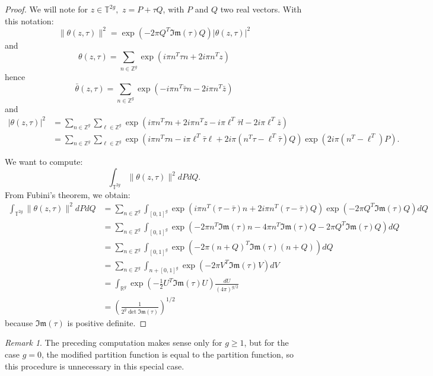 \documentclass{article}
\theoremstyle{definition}
\theoremstyle{remark}
\newtheorem{Remark}[theorem]{Remark}
\begin{document}
\begin{proof}We will note for $z \in \mathbb{T}^{2g}, $ $z=P+\tau Q$, with $P$ and $Q$ two real vectors. With this notation: $$\|\theta(z,\tau)\|^{2}=\exp\left(-2\pi Q^{T}\mathfrak{Im}(\tau) Q \right)|\theta(z,\tau)|^{2}$$
and $$\theta(z,\tau)=\sum_{n \in \mathbb{Z}^{g}}\exp\left(i\pi n^{T}\tau n+2i\pi n^{T}z \right)$$
hence $$\bar{\theta}(z,\tau)=\sum_{n \in \mathbb{Z}^{g}}\exp\left(-i\pi n^{T}\bar{\tau} n-2i\pi n^{T}\bar{z} \right)$$
and \begin{align*}|\theta(z,\tau)|^{2}&=\sum_{n\in \mathbb{Z}^{g}}\sum_{\ell\in \mathbb{Z}^{g}}\exp\left(i\pi n^{T}\tau n+2i\pi n^{T}z -i\pi \ell^{T}\bar{\tau} l-2i\pi \ell^{T}\bar{z}\right)\\&=\sum_{n\in \mathbb{Z}^{g}}\sum_{\ell\in \mathbb{Z}^{g}}\exp\left(i\pi n^{T}\tau n -i\pi \ell^{T}\bar{\tau} \ell+2i\pi (n^{T}\tau - \ell^{T}\bar{\tau})Q\right)\exp\left(2i\pi (n^{T}-\ell^{T})P \right).\end{align*}

We want to compute: $$\int_{\mathbb{T}^{2g}}\|\theta(z,\tau)\|^{2}dP dQ. $$ From Fubini's theorem, we obtain: 
\begin{align*}
\int_{\mathbb{T}^{2g}}\|\theta(z,\tau)\|^{2}dP dQ&=\sum_{n\in \mathbb{Z}^{g}}\int_{[0,1]^{g}}\exp\left(i\pi n^{T}(\tau-\bar{\tau}) n +2i\pi n^{T}(\tau - \bar{\tau})Q\right)\exp\left(-2\pi Q^{T}\mathfrak{Im}(\tau) Q \right)dQ \\&=\sum_{n\in \mathbb{Z}^{g}}\int_{[0,1]^{g}}\exp \left(-2\pi n^{T}\mathfrak{Im}(\tau)n-4\pi n^{T}\mathfrak{Im}(\tau)Q-2\pi Q^{T}\mathfrak{Im}(\tau)Q \right)dQ \\&=\sum_{n\in \mathbb{Z}^{g}}\int_{[0,1]^{g}}\exp\left(-2\pi (n+Q)^{T}\mathfrak{Im}(\tau)(n+Q)\right) dQ \\&=\sum_{n\in \mathbb{Z}^{g}}\int_{n+[0,1]^{g}}\exp(-2\pi V^{T}\mathfrak{Im}(\tau) V)dV \\&=\int_{\mathbb{R}^{g}}\exp\left(-\frac{1}{2}U^{T}\mathfrak{Im(\tau)}U \right)\frac{dU}{(4\pi)^{g/2}}\\&=\left(\frac{1}{2^{g}\det\mathfrak{Im}(\tau)}\right)^{1/2}
\end{align*}
because $\mathfrak{Im}(\tau)$ is positive definite.
\end{proof}

\begin{Remark}
    The preceding computation makes sense only for $g\geq1$, but for the case $g=0$, the modified partition function is equal to the partition function, so this procedure is unnecessary in this special case.
\end{Remark}
\end{document}
